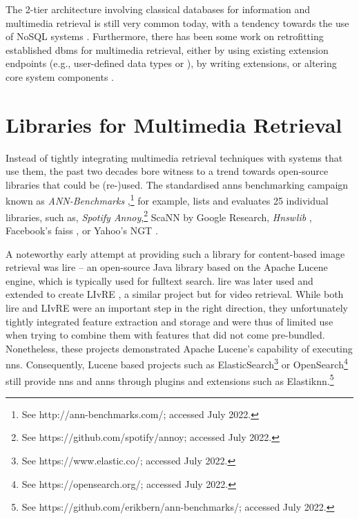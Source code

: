 The 2-tier architecture involving classical databases for information and multimedia retrieval is still very common today, with a tendency towards the use of NoSQL systems \cite{Muhleisen:2014Old,Oliveira:2017Performance}. Furthermore, there has been some work on retrofitting established \acrshort{dbms} for multimedia retrieval, either by using existing extension endpoints (e.g., user-defined data types or ), by writing extensions, or altering core system components \cite{Guliato:2009PostgreSQL,Whang:2010Tightly,Giangreco:2014Adam,Fleites:2013Efficient,Whang:2015DB,Yang:2020Pase}.

\section{Libraries for Multimedia Retrieval}
\label{section:nns_libraries}

Instead of tightly integrating multimedia retrieval techniques with systems that use them, the past two decades bore witness to a trend towards open-source libraries that could be (re-)used. The standardised \acrshort{anns} benchmarking campaign known as \emph{ANN-Benchmarks} \cite{Aumueller:2017ANN},\footnote{See http://ann-benchmarks.com/; accessed July 2022.} for example, lists and evaluates 25 individual libraries, such as, \emph{Spotify Annoy},\footnote{See https://github.com/spotify/annoy; accessed July 2022.} ScaNN \cite{Guo:2020Accelerating} by Google Research, \emph{Hnswlib} \cite{Malkov:2018Efficient}, Facebook's \acrshort{faiss} \cite{Johnson:2019Billion}, or Yahoo's NGT \cite{Iwasaki2016:Pruned}.

A noteworthy early attempt at providing such a library for content-based image retrieval was \acrfull{lire} \cite{Luc:2008LIRE} -- an open-source Java library based on the Apache Lucene engine, which is typically used for fulltext search. \acrshort{lire} was later used and extended to create LIvRE \cite{Oliveira:2016Large}, a similar project but for video retrieval. While both \acrshort{lire} and LIvRE were an important step in the right direction, they unfortunately tightly integrated feature extraction and storage and were thus of limited use when trying to combine them with features that did not come pre-bundled. Nonetheless, these projects demonstrated Apache Lucene's capability of executing \acrshort{nns}. Consequently, Lucene based projects such as ElasticSearch\footnote{See https://www.elastic.co/; accessed July 2022.} or OpenSearch\footnote{See https://opensearch.org/; accessed July 2022.} still provide \acrshort{nns} and \acrshort{anns} through plugins and extensions such as Elastiknn.\footnote{See https://github.com/erikbern/ann-benchmarks/; accessed July 2022.}

